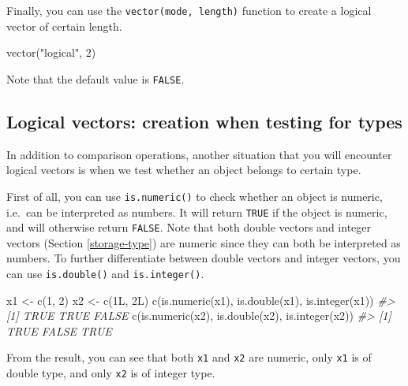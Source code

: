 \documentclass[
]{book}
\newenvironment{Shaded}{\begin{snugshade}}{\end{snugshade}}
\newcommand{\CommentTok}[1]{\textcolor[rgb]{0.56,0.35,0.01}{\textit{#1}}}
\newcommand{\DecValTok}[1]{\textcolor[rgb]{0.00,0.00,0.81}{#1}}
\newcommand{\FunctionTok}[1]{\textcolor[rgb]{0.00,0.00,0.00}{#1}}
\newcommand{\NormalTok}[1]{#1}
\newcommand{\OtherTok}[1]{\textcolor[rgb]{0.56,0.35,0.01}{#1}}
\newcommand{\StringTok}[1]{\textcolor[rgb]{0.31,0.60,0.02}{#1}}
\begin{document}
Finally, you can use the \texttt{vector(mode,\ length)} function to create a logical vector of certain length.

\begin{Shaded}
\begin{Highlighting}[]
\FunctionTok{vector}\NormalTok{(}\StringTok{"logical"}\NormalTok{, }\DecValTok{2}\NormalTok{)}
\end{Highlighting}
\end{Shaded}

Note that the default value is \texttt{FALSE}.

\hypertarget{logical-vectors-creation-when-testing-for-types}{%
\subsection{Logical vectors: creation when testing for types}\label{logical-vectors-creation-when-testing-for-types}}

In addition to comparison operations, another situation that you will encounter logical vectors is when we test whether an object belongs to certain type.

First of all, you can use \texttt{is.numeric()} to check whether an object is numeric, i.e.~can be interpreted as numbers. It will return \texttt{TRUE} if the object is numeric, and will otherwise return \texttt{FALSE}. Note that both double vectors and integer vectors (Section \ref{storage-type}) are numeric since they can both be interpreted as numbers. To further differentiate between double vectors and integer vectors, you can use \texttt{is.double()} and \texttt{is.integer()}.

\begin{Shaded}
\begin{Highlighting}[]
\NormalTok{x1 }\OtherTok{\textless{}{-}} \FunctionTok{c}\NormalTok{(}\DecValTok{1}\NormalTok{, }\DecValTok{2}\NormalTok{)}
\NormalTok{x2 }\OtherTok{\textless{}{-}} \FunctionTok{c}\NormalTok{(1L, 2L)}
\FunctionTok{c}\NormalTok{(}\FunctionTok{is.numeric}\NormalTok{(x1), }\FunctionTok{is.double}\NormalTok{(x1), }\FunctionTok{is.integer}\NormalTok{(x1))}
\CommentTok{\#\textgreater{} [1]  TRUE  TRUE FALSE}
\FunctionTok{c}\NormalTok{(}\FunctionTok{is.numeric}\NormalTok{(x2), }\FunctionTok{is.double}\NormalTok{(x2), }\FunctionTok{is.integer}\NormalTok{(x2))}
\CommentTok{\#\textgreater{} [1]  TRUE FALSE  TRUE}
\end{Highlighting}
\end{Shaded}

From the result, you can see that both \texttt{x1} and \texttt{x2} are numeric, only \texttt{x1} is of double type, and only \texttt{x2} is of integer type.
\end{document}
